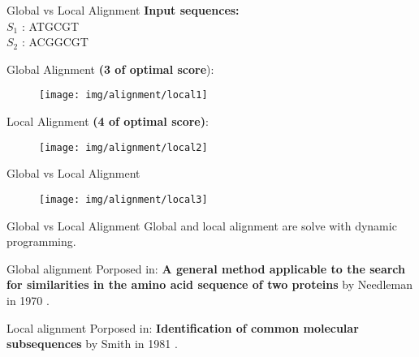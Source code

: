 \documentclass[10pt]{beamer}
\newcommand{\1}{
	\setbeamertemplate{background}{
		\texttt{[image: img/1]}
		\tikz[overlay] \fill[fill opacity=0.75,fill=white] (0,0) rectangle (-\paperwidth,\paperheight);
	}
}
\begin{document}
\begin{frame}{Global vs Local Alignment}
\textbf{Input sequences:} \\	
$S_1$ : ATGCGT \\
$S_2$ : ACGGCGT


\begin{block}{}
	Global Alignment \textbf{(3 of optimal score}):
	\begin{figure}[]
		\centering
		\texttt{[image: img/alignment/local1]}
		\label{img:uniprot}
	\end{figure}
	
	Local Alignment \textbf{(4 of optimal score)}:
	\begin{figure}[]
		\centering
		\texttt{[image: img/alignment/local2]}
		\label{img:uniprot}
	\end{figure}
\end{block}{}
\end{frame}

\begin{frame}{Global vs Local Alignment}
\begin{figure}[]
	\centering
	\texttt{[image: img/alignment/local3]}
	\label{img:uniprot}
\end{figure}
\end{frame}

\begin{frame}{Global vs Local Alignment}
	Global and local alignment are solve with dynamic programming.
	
	\begin{block}{Global alignment}
		\centering
		Porposed in: \textbf{A general method applicable to the search for similarities in the amino acid sequence of two proteins} by Needleman in 1970 \cite{needleman1970general}.
	\end{block}

	\begin{block}{Local alignment}
		\centering
		Porposed in: \textbf{Identification of common molecular subsequences} by Smith in 1981 \cite{smith1981identification}.
	\end{block}
	
\end{frame}
\end{document}
